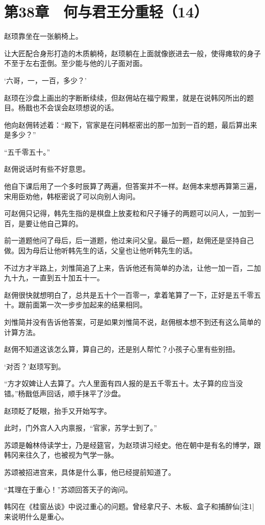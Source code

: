 \section{第38章　何与君王分重轻（14）}

赵顼靠坐在一张躺椅上。

让大匠配合身形打造的木质躺椅，赵顼躺在上面就像嵌进去一般，使得瘫软的身子不至于左右歪倒。至少能与他的儿子面对面。

‘六哥，一，一百，多少？’

赵顼在沙盘上画出的字断断续续，但赵佣站在福宁殿里，就是在说韩冈所出的题目。杨戬也不会误会赵顼想说的话。

他向赵佣转述着：“殿下，官家是在问韩枢密出的那一加到一百的题，最后算出来是多少？”

“五千零五十。”

赵佣说话时有些不好意思。

他自下课后用了一个多时辰算了两遍，但答案并不一样。赵佣本来想再算第三遍，宋用臣劝他，韩枢密说了可以向别人询问。

可赵佣只记得，韩先生指的是棋盘上放麦粒和尺子锤子的两题可以问人，一加到一百，是要让他自己算的。

前一道题他问了母后，后一道题，他过来问父皇。最后一题，赵佣还是坚持自己做。因为母后让他听韩先生的话，父皇也让他听韩先生的话。

不过方才半路上，刘惟简追了上来，告诉他还有简单的办法，让他一加一百，二加九十九，一直到五十加五十一。

赵佣很快就想明白了，总共是五十个一百零一，拿着笔算了一下，正好是五千零五十。跟前面第一次一步步加起来的结果相同。

刘惟简并没有告诉他答案，可是如果刘惟简不说，赵佣根本想不到还有这么简单的计算方法。

赵佣不知道这该怎么算，算自己的，还是别人帮忙？小孩子心里有些别扭。

‘对否？’赵顼写到。

“方才奴婢让人去算了。六人里面有四人报的是五千零五十。太子算的应当没错。”杨戬低声回话，顺手抹平了沙盘。

赵顼眨了眨眼，抬手又开始写字。

此时，门外宫人入内禀报，“官家，苏学士到了。”

苏颂是翰林侍读学士，乃是经筵官，为赵顼讲习经史。他在朝中是有名的博学，跟韩冈来往久了，也被视为气学一脉。

苏颂被招进宫来，具体是什么事，他已经提前知道了。

“其理在于重心！”苏颂回答天子的询问。

韩冈在《桂窗丛谈》中说过重心的问题。曾经拿尺子、木板、盒子和捕醉仙[注1]来说明什么是重心。

